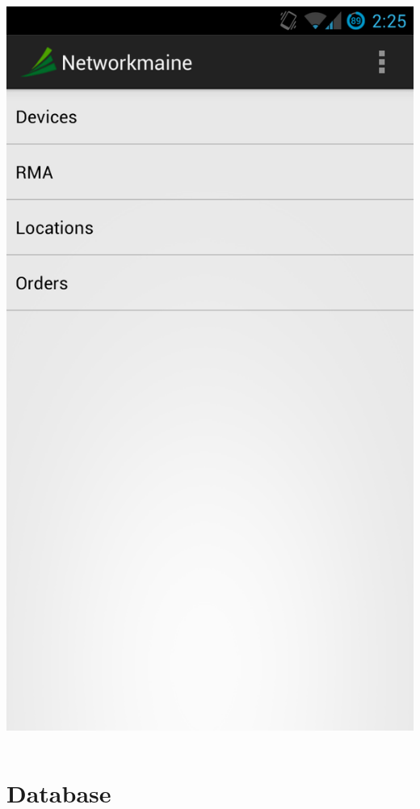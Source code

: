 \documentclass[]{beamer}
\begin{document}
\begin{frame}
\begin{columns}[c]
\column{1in}
\includegraphics[width=\linewidth]{images/nm.png}
\end{columns}

\end{frame}




\section{Database}
\end{document}
